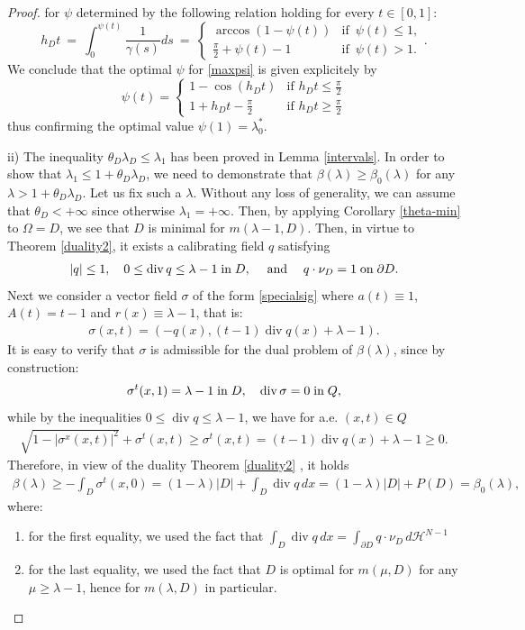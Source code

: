 \documentclass[reqno,11pt]{amsart}
\theoremstyle{definition}
\numberwithin{equation}{section}
\DeclareMathOperator{\Div}{div}
\newcommand{\HH}{\mathcal{H}}
\newcommand{\tinm}[1]{\text{\;#1\;}}
\newcommand{\1}{{{\bf 1}\kern-0,28em\rm l}}
\def\O{\Omega}
\def\l{\lambda}
\begin{document}
\begin{proof}
for $\psi$ determined by the following relation holding for every $t\in [0,1]$: 
$$h_D t\ =\ \int_0^{\psi(t)} \frac{1}{\gamma(s)} ds\ =\ \begin{cases}
\arccos (1-\psi(t)) &\text{if }\, \psi(t)\le 1,\\
\frac{\pi}{2} + \psi(t)-1  &\text{if }\, \psi(t)>1.
\end{cases}. $$
We conclude that  the optimal $\psi$ for \eqref{maxpsi} is given explicitely by
$$ \psi(t) =\begin{cases}
 1- \cos(h_D t) & \text{if $h_D t\le \frac{\pi}{2}$}\\
1 + h_D t -\frac{\pi}{2} & \text{if $h_D t\ge \frac{\pi}{2}$}
\end{cases}
$$ 
thus confirming the optimal value  $\psi(1)=\l_0^*$. 

\medskip\noindent
ii) The inequality $\theta_D\lambda_D \le \lambda_1$ has been proved in Lemma   \ref{intervals}. 
In order to show that $\lambda_1 \le 1+ \theta_D\lambda_D$,  we need to demonstrate that $\beta(\l)\ge\beta_0(\l)$ for any  $\lambda > 1+ \theta_D\lambda_D$.
 Let us fix such a $\l$. Without any loss of generality, we can assume that $\theta_D<+\infty$ since otherwise $\l_1=+\infty$.
 Then, by applying Corollary \ref{theta-min} to $\O=D$, we see that $D$ is minimal for  $m(\lambda-1,D)$. Then, in virtue to Theorem \ref{duality2}, it exists a calibrating field $q$ satisfying
\begin{align*}
|q|\le 1, \quad
0\le \Div q \le \lambda-1 \tinm{in} D,\quad\tinm{and}\quad q\cdot \nu_D =1 \tinm{on} \partial D.
\end{align*}
Next we consider a vector field $\sigma$ of the form \eqref{specialsig} where $a(t)\equiv 1$, $A(t)=t-1$ and $r(x)\equiv \l-1$, that is:
\begin{align*}
\sigma(x,t)= ( -q(x), (t-1)\Div q(x) +\lambda -1 ).
\end{align*}
It is easy to verify that $\sigma$ is admissible for the dual problem of $\beta(\lambda)$, since by construction:
\begin{align*}
\sigma^t(x,1) = \lambda -1  \tinm{in} D, \quad \Div\sigma =0 \tinm{in} Q, 
\end{align*}
while by the inequalities $0\le \Div q \le \l-1$, we have  for a.e.  $(x,t)\in Q$
\begin{align*}
\sqrt{1-|\sigma^x(x,t)|^2} +\sigma^t(x,t) \ge \sigma^t (x,t) = (t-1)\Div q(x) +\lambda -1   \ge 0.
\end{align*}
Therefore,  in view of the duality Theorem \ref{duality2} ,   it holds
\begin{align*}
\beta(\lambda) \ge -\int_D \sigma^t(x,0)= (1-\lambda)|D| + \int_D \Div q \, dx=  (1-\lambda)|D| + P(D)   =\beta_0(\lambda) ,
\end{align*}
where: 
\begin{enumerate}
\item [-] for the first equality, we used the fact that $\int_D \Div q \, dx = \int_{\partial D} q\cdot \nu_D\, d\HH^{N-1}$
\item [-] for the last equality, we used the fact that $D$ is optimal for $m(\mu,D)$  for any $\mu\ge \l-1$, hence for $m(\l,D)$ in particular.
\end{enumerate}


\end{proof}
\end{document}
